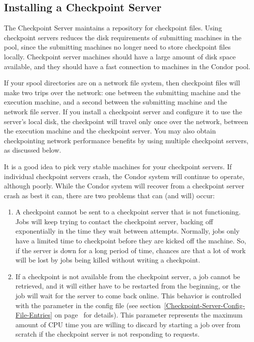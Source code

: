 \subsection{\label{sec:Ckpt-Server} Installing a Checkpoint Server}

The Checkpoint Server maintains a repository for checkpoint files.
Using checkpoint servers reduces the disk requirements of submitting
machines in the pool, since the submitting machines no longer need to
store checkpoint files locally.
Checkpoint server machines should have a large amount of disk space
available, and they should have a fast connection to machines
in the Condor pool.

If your spool directories are on a network file system, then
checkpoint files will make two trips over the network: one between the
submitting machine and the execution machine, and a second between the
submitting machine and the network file server.
If you install a checkpoint server and configure it to use the
server's local disk, the checkpoint will travel only once over the
network, between the execution machine and the checkpoint server.
You may also obtain checkpointing network performance benefits by
using multiple checkpoint servers, as discussed below.

\Note It is a good idea to pick very stable machines for your checkpoint
servers.
If individual checkpoint servers crash, the Condor system will continue to
operate, although poorly.  
While the Condor system will recover from a checkpoint server crash
as best it can, there are two problems that can (and will) occur:
\begin{enumerate}

\item A checkpoint cannot be sent to a checkpoint server that
is not functioning.
Jobs will keep trying to contact the checkpoint server, backing
off exponentially in the time they wait between attempts.
Normally, jobs only have a limited time to checkpoint before they are
kicked off the machine.
So, if the server is down for a long period of time, chances are that
a lot of work will be lost by jobs being killed without writing a
checkpoint. 

\item If a checkpoint is not available from the checkpoint
server, a job cannot be
retrieved, and it will either have to be restarted from
the beginning, or the job will wait for the server to come back online.
This behavior is controlled with the
 parameter in the config file (see
section~\ref{Checkpoint-Server-Config-File-Entries} on
page~\pageref{Checkpoint-Server-Config-File-Entries} for details).
This parameter represents the maximum amount of CPU time you are
willing to discard by starting a job over from scratch if the
checkpoint server is not responding to requests.

\end{enumerate}

